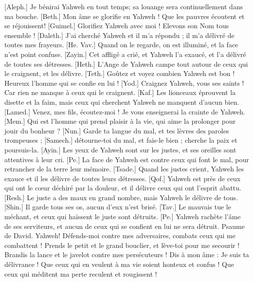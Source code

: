\begin{multicols}{2}
[Aleph.] Je bénirai Yahweh en tout temps; sa louange sera continuellement dans ma bouche.
[Beth.] Mon âme se glorifie en Yahweh ! Que les pauvres écoutent et se réjouissent!
[Guimel.] Glorifiez Yahweh avec moi ! Elevons son Nom tous ensemble !
[Daleth.] J'ai cherché Yahweh et il m'a répondu ; il m'a délivré de toutes mes frayeurs.
[He. Vav.] Quand on le regarde, on est illuminé, et la face n'est point confuse.
[Zayin.] Cet affligé a crié, et Yahweh l'a exaucé, et l'a délivré de toutes ses détresses.
[Heth.] L'Ange de Yahweh campe tout autour de ceux qui le craignent, et les délivre.
[Teth.] Goûtez et voyez combien Yahweh est bon ! Heureux l'homme qui se confie en lui !
[Yod.] Craignez Yahweh, vous ses saints ! Car rien ne manque à ceux qui le craignent.
[Kaf.] Les lionceaux éprouvent la disette et la faim, mais ceux qui cherchent Yahweh ne manquent d'aucun bien.
[Lamed.] Venez, mes fils, écoutez-moi ! Je vous enseignerai la crainte de Yahweh.
[Mem.] Qui est l'homme qui prend plaisir à la vie, qui aime la prolonger pour jouir du bonheur ?
[Nun.] Garde ta langue du mal, et tes lèvres des paroles trompeuses ;
[Samech.] détourne-toi du mal, et fais-le bien ; cherche la paix et poursuis-la.
[Ayin.] Les yeux de Yahweh sont sur les justes, et ses oreilles sont attentives à leur cri.
[Pe.] La face de Yahweh est contre ceux qui font le mal, pour retrancher de la terre leur mémoire.
[Tsade.] Quand les justes crient, Yahweh les exauce et il les délivre de toutes leurs détresses.
[Qof.] Yahweh est près de ceux qui ont le cœur déchiré par la douleur, et il délivre ceux qui ont l'esprit abattu.
[Resh.] Le juste a des maux en grand nombre, mais Yahweh le délivre de tous.
[Shin.] Il garde tous ses os, aucun d'eux n'est brisé.
[Tav.] Le mauvais tue le méchant, et ceux qui haïssent le juste sont détruits.
[Pe.] Yahweh rachète l'âme de ses serviteurs, et aucun de ceux qui se confient en lui ne sera détruit.
\VerseOne{}Psaume de David. Yahweh! Défends-moi contre mes adversaires, combats ceux qui me combattent !
Prends le petit et le grand bouclier, et lève-toi pour me secourir !
Brandis la lance et le javelot contre mes persécuteurs ! Dis à mon âme : Je suis ta délivrance !
Que ceux qui en veulent à ma vie soient honteux et confus ! Que ceux qui méditent ma perte reculent et rougissent !

\end{multicols}
